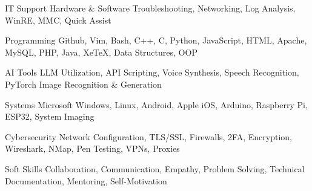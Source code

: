 
\begin{cvskills}
  \cvskill
    {IT Support} %
	{Hardware \& Software Troubleshooting, Networking, Log Analysis, WinRE, MMC, Quick Assist} %

  \cvskill
    {Programming} %
    {Github, Vim, Bash, C++, C, Python, JavaScript, HTML, Apache, MySQL, PHP, Java, XeTeX, Data Structures, OOP} %

  \cvskill
    {AI Tools} %
	{LLM Utilization, API Scripting, Voice Synthesis, Speech Recognition, PyTorch Image Recognition \& Generation} %

  \cvskill
    {Systems} %
	{Microsoft Windows, Linux, Android, Apple iOS, Arduino, Raspberry Pi, ESP32, System Imaging} %

  \cvskill
    {Cybersecurity} %
	{Network Configuration, TLS/SSL, Firewalls, 2FA, Encryption, Wireshark, NMap, Pen Testing, VPNs, Proxies} %

  \cvskill
    {Soft Skills} %
	{Collaboration, Communication, Empathy, Problem Solving, Technical Documentation, Mentoring, Self-Motivation} %

\end{cvskills}
